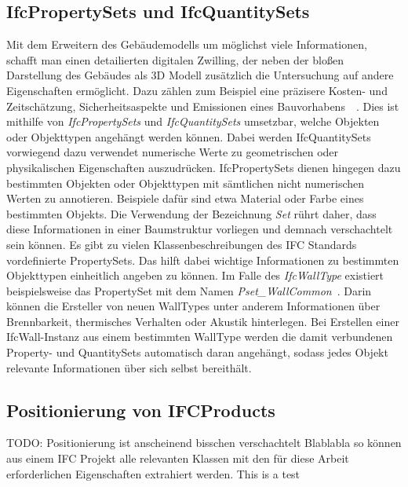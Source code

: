 \subsection{IfcPropertySets und IfcQuantitySets}\label{basics:ifc_properties}
Mit dem Erweitern des Gebäudemodells um möglichst viele Informationen, schafft man einen detailierten digitalen Zwilling, der neben der bloßen Darstellung des Gebäudes als 3D Modell zusätzlich die Untersuchung auf andere Eigenschaften ermöglicht.
Dazu zählen zum Beispiel eine präzisere Kosten- und Zeitschätzung, Sicherheitsaspekte und Emissionen eines Bauvorhabens~\cite{Industry93:online}~\cite{Ding2014}. 
Dies ist mithilfe von \textit{IfcPropertySets} und \textit{IfcQuantitySets} umsetzbar, welche Objekten oder Objekttypen angehängt werden können.
Dabei werden IfcQuantitySets vorwiegend dazu verwendet numerische Werte zu geometrischen oder physikalischen Eigenschaften auszudrücken.
IfcPropertySets dienen hingegen dazu bestimmten Objekten oder Objekttypen mit sämtlichen nicht numerischen Werten zu annotieren.
Beispiele dafür sind etwa Material oder Farbe eines bestimmten Objekts.
Die Verwendung der Bezeichnung \textit{Set} rührt daher, dass diese Informationen in einer Baumstruktur vorliegen und demnach verschachtelt sein können.
Es gibt zu vielen Klassenbeschreibungen des IFC Standards vordefinierte PropertySets.
Das hilft dabei wichtige Informationen zu bestimmten Objekttypen einheitlich angeben zu können.
Im Falle des \textit{IfcWallType} existiert beispielsweise das PropertySet mit dem Namen \textit{Pset\_WallCommon}~\cite{IFC4310PSetWallCommon:online}.
Darin können die Ersteller von neuen WallTypes unter anderem Informationen über Brennbarkeit, thermisches Verhalten oder Akustik hinterlegen.
Bei Erstellen einer IfcWall-Instanz aus einem bestimmten WallType werden die damit verbundenen Property- und QuantitySets automatisch daran angehängt, sodass jedes Objekt relevante Informationen über sich selbst bereithält.

\subsection{Positionierung von IFCProducts}
TODO: Positionierung ist anscheinend bisschen verschachtelt
Blablabla so können aus einem IFC Projekt alle relevanten Klassen mit den für diese Arbeit erforderlichen Eigenschaften extrahiert werden.
This is a test

